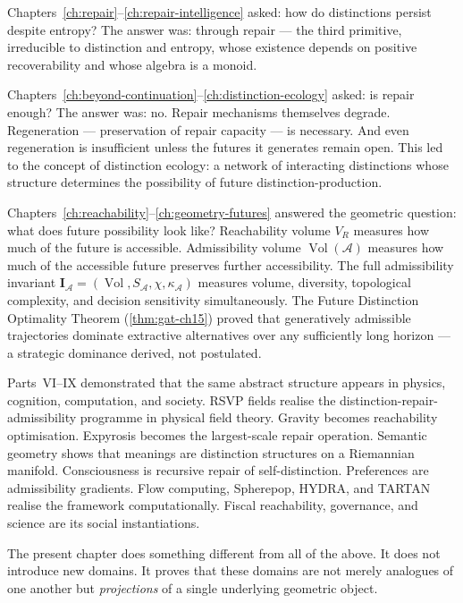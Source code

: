 \documentclass[12pt,twoside,openright]{book}
\newcommand{\adm}{\mathcal{A}}
\newcommand{\Vol}{\operatorname{Vol}}
\begin{document}
Chapters~\ref{ch:repair}--\ref{ch:repair-intelligence}
asked: how do distinctions persist despite entropy? The
answer was: through repair — the third primitive,
irreducible to distinction and entropy, whose existence
depends on positive recoverability and whose algebra
is a monoid.

Chapters~\ref{ch:beyond-continuation}--\ref{ch:distinction-ecology}
asked: is repair enough? The answer was: no. Repair
mechanisms themselves degrade. Regeneration — preservation
of repair capacity — is necessary. And even regeneration
is insufficient unless the futures it generates remain
open. This led to the concept of distinction ecology:
a network of interacting distinctions whose structure
determines the possibility of future distinction-production.

Chapters~\ref{ch:reachability}--\ref{ch:geometry-futures}
answered the geometric question: what does future
possibility look like? Reachability volume $V_R$
measures how much of the future is accessible.
Admissibility volume $\Vol(\adm)$ measures how much
of the accessible future preserves further accessibility.
The full admissibility invariant
$\mathbf{I}_\adm = (\Vol, S_\adm, \chi, \kappa_\adm)$
measures volume, diversity, topological complexity, and
decision sensitivity simultaneously. The Future
Distinction Optimality Theorem
(\cref{thm:gat-ch15}) proved that generatively admissible
trajectories dominate extractive alternatives over any
sufficiently long horizon — a strategic dominance
derived, not postulated.

Parts~VI--IX demonstrated that the same abstract structure
appears in physics, cognition, computation, and society.
RSVP fields realise the distinction-repair-admissibility
programme in physical field theory.
Gravity becomes reachability optimisation.
Expyrosis becomes the largest-scale repair operation.
Semantic geometry shows that meanings are distinction
structures on a Riemannian manifold.
Consciousness is recursive repair of self-distinction.
Preferences are admissibility gradients.
Flow computing, Spherepop, HYDRA, and TARTAN realise
the framework computationally.
Fiscal reachability, governance, and science are its
social instantiations.

The present chapter does something different from all
of the above. It does not introduce new domains.
It proves that these domains are not merely analogues
of one another but \emph{projections} of a single
underlying geometric object.

\end{document}
